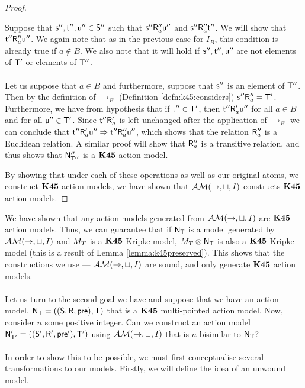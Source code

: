 \begin{proof}
\begin{itemize}
  Suppose that $\mathrm{\mathsf{s}}'',\mathrm{\mathsf{t}}'',\mathrm{\mathsf{u}}'' \in \mathrm{\mathsf{S}}''$ such that $\mathrm{\mathsf{s}}'' \mathrm{\mathsf{R}}''_a
  \mathrm{\mathsf{u}}''$ and $\mathrm{\mathsf{s}}'' \mathrm{\mathsf{R}}''_a \mathrm{\mathsf{t}}''$.
  We will show that $\mathrm{\mathsf{t}}'' \mathrm{\mathsf{R}}''_a \mathrm{\mathsf{u}}''$.
  We again note that as in the previous case for $I_B$, this condition is
  already true if $a \notin B$.
  We also note that it will hold if $\mathrm{\mathsf{s}}'',\mathrm{\mathsf{t}}'',\mathrm{\mathsf{u}}''$ are not
  elements of $\mathrm{\mathsf{T}}'$ or elements of $\mathrm{\mathsf{T}}''$.\\
  \\
  Let us suppose that $a \in B$ and furthermore, suppose that $\mathrm{\mathsf{s}}''$ is an
  element of $\mathrm{\mathsf{T}}''$.
  Then by the definition of $\to_B$ (Definition \ref{defn:k45:considers})
  $\mathrm{\mathsf{s}}'' \mathrm{\mathsf{R}}''_a = \mathrm{\mathsf{T}}'$.
  Furthermore, we have from hypothesis that if $\mathrm{\mathsf{t}}'' \in \mathrm{\mathsf{T}}'$, then $\mathrm{\mathsf{t}}''
  \mathrm{\mathsf{R}}'_a \mathrm{\mathsf{u}}''$ for all $a \in B$ and for all $\mathrm{\mathsf{u}}'' \in \mathrm{\mathsf{T}}'$.
  Since $\mathrm{\mathsf{t}}'' \mathrm{\mathsf{R}}'_a$ is left unchanged after the application of $\to_B$ we
  can conclude that $\mathrm{\mathsf{t}}'' \mathrm{\mathsf{R}}'_a \mathrm{\mathsf{u}}'' \Rightarrow \mathrm{\mathsf{t}}'' \mathrm{\mathsf{R}}''_a \mathrm{\mathsf{u}}''$,
  which shows that the relation $\mathrm{\mathsf{R}}''_a$ is a Euclidean relation.
  A similar proof will show that $\mathrm{\mathsf{R}}''_a$ is a transitive relation, and thus
  shows that $\mathrm{\mathsf{N}}''_{\mathrm{\mathsf{T}}''}$ is a $\bf K45$ action model.
	\end{itemize}
  By showing that under each of these operations as well as our original atoms,
  we construct $\bf K45$ action models, we have shown that $\mathcal{AM}(\to,\sqcup,I)$
  constructs $\bf K45$ action models.
\end{proof}

We have shown that any action models generated from $\mathcal{AM}(\to,\sqcup, I)$ are
$\bf K45$ action models.
Thus, we can guarantee that if $\mathrm{\mathsf{N}}_\mathrm{\mathsf{T}}$ is a model generated by
$\mathcal{AM}(\to,\sqcup,I)$ and $M_T$ is a $\bf K45$ Kripke model, $M_T
\otimes \mathrm{\mathsf{N}}_\mathrm{\mathsf{T}}$ is also a $\bf K45$ Kripke model (this is a result of Lemma
  \ref{lemma:k45preserved}).
This shows that the constructions we use --- $\mathcal{AM}(\to, \sqcup, I)$ are
sound, and only generate $\bf K45$ action models.\\
\\
Let us turn to the second goal we have and suppose that we have an action model, $\mathrm{\mathsf{N}}_\mathrm{\mathsf{T}}
= ((\mathrm{\mathsf{S}},\mathrm{\mathsf{R}},\mathrm{\mathsf{pre}}),\mathrm{\mathsf{T}})$ that is a $\bf K45$ multi-pointed action model.
Now, consider $n$ some positive integer.
Can we construct an action model $\mathrm{\mathsf{N}}'_{\mathrm{\mathsf{T}}'} = ((\mathrm{\mathsf{S}}',\mathrm{\mathsf{R}}',\mathrm{\mathsf{pre}}'),\mathrm{\mathsf{T}}')$
using $\mathcal{AM}(\to,\sqcup,I)$ that is $n$-bisimilar to $\mathrm{\mathsf{N}}_\mathrm{\mathsf{T}}$?\\
\\
In order to show this to be possible, we must first conceptualise several
transformations to our models.
Firstly, we will define the idea of an unwound model.

